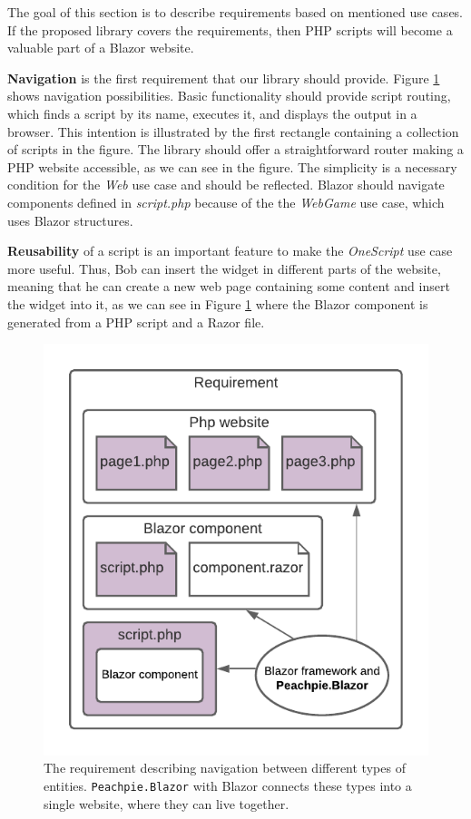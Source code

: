 The goal of this section is to describe requirements based on mentioned use cases.
If the proposed library covers the requirements, then PHP scripts will become a valuable part of a Blazor website.
\par
\textbf{Navigation} is the first requirement that our library should provide.
Figure \ref{img10:scripts} shows navigation possibilities.
Basic functionality should provide script routing, which finds a script by its name, executes it, and displays the output in a browser.
This intention is illustrated by the first rectangle containing a collection of scripts in the figure.
The library should offer a straightforward router making a PHP website accessible, as we can see in the figure.
The simplicity is a necessary condition for the \textit{Web} use case and should be reflected.
Blazor should navigate components defined in \textit{script.php} because of the the \textit{WebGame} use case, which uses Blazor structures.
\par
\textbf{Reusability} of a script is an important feature to make the \textit{OneScript} use case more useful.
Thus, Bob can insert the widget in different parts of the website, meaning that he can create a new web page containing some content and insert the widget into it, as we can see in Figure \ref{img10:scripts} where the Blazor component is generated from a PHP script and a Razor file.
\par
\begin{figure}
\centering
\includegraphics{./img/Requirement}
\caption{The requirement describing navigation between different types of entities. 
\texttt{Peachpie.Blazor} with Blazor connects these types into a single website, where they can live together.
}
\label{img10:scripts}
\end{figure} 
